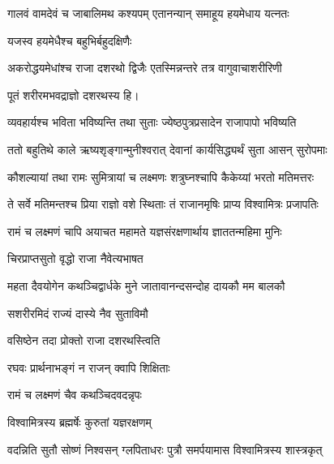 

\twolineshloka
{गालवं वामदेवं च जाबालिमथ कश्यपम्}
{एतानन्यान् समाहूय हयमेधाय यत्नतः} %

\onelineshloka
{यजस्व हयमेधैश्च बहुभिर्बहुदक्षिणैः}%



\twolineshloka
{अकरोद्धयमेधांश्च राजा दशरथो द्विजैः}
{एतस्मिन्नन्तरे तत्र वागुवाचाशरीरिणी} %


पूतं शरीरमभवद्राज्ञो दशरथस्य हि।

\twolineshloka
{व्यवहार्यश्च भविता भविष्यन्ति तथा सुताः}
{ज्येष्ठपुत्रप्रसादेन राजापापो भविष्यति} %



\twolineshloka
{ततो बहुतिथे काले ऋष्यशृङ्गान्मुनीश्वरात्}
{देवानां कार्यसिद्ध्यर्थं सुता आसन् सुरोपमाः} %

\twolineshloka
{कौशल्यायां तथा रामः सुमित्रायां च लक्ष्मणः}
{शत्रुघ्नश्चापि कैकेय्यां भरतो मतिमत्तरः} %

\twolineshloka
{ते सर्वे मतिमन्तश्च प्रिया राज्ञो वशे स्थिताः}
{तं राजानमृषिः प्राप्य विश्वामित्रः प्रजापतिः} %

\twolineshloka
{रामं च लक्ष्मणं चापि अयाचत महामते}
{यज्ञसंरक्षणार्थाय ज्ञाततन्महिमा मुनिः} %

\onelineshloka
{चिरप्राप्तसुतो वृद्धो राजा नैवेत्यभाषत}%



\twolineshloka
{महता दैवयोगेन कथञ्चिद्वार्धके मुने}
{जातावानन्दसन्दोह दायकौ मम बालकौ} %

\onelineshloka
{सशरीरमिदं राज्यं दास्ये नैव सुताविमौ}%



\onelineshloka
{वसिष्ठेन तदा प्रोक्तो राजा दशरथस्त्विति}%



\onelineshloka
{रघवः प्रार्थनाभङ्गं न राजन् क्वापि शिक्षिताः}%



\onelineshloka
{रामं च लक्ष्मणं चैव कथञ्चिदवदन्नृपः}%



\onelineshloka
{विश्वामित्रस्य ब्रह्मर्षेः कुरुतां यज्ञरक्षणम्}%



\twolineshloka
{वदन्निति सुतौ सोष्णं निश्वसन् ग्लपिताधरः}
{पुत्रौ समर्पयामास विश्वामित्रस्य शास्त्रकृत्} %

